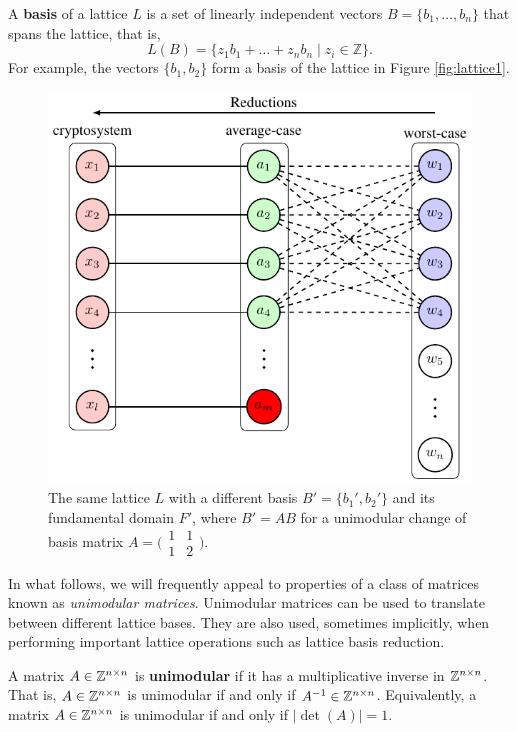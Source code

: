 \documentclass[../main.tex]{subfiles}
\begin{document}
A \textbf{basis} 
\reversemarginpar
{}
of a lattice $L$ is a set of linearly independent vectors $B = \{b_1, \dots, b_n\}$ that spans the lattice, that is,
\begin{equation*}
    L(B)= \{z_1 b_1 + \dots + z_n b_n \mid z_i \in \mathbb{Z}\}.
\end{equation*}
For example, the vectors $\{b_1,b_2\}$ form a basis of the lattice in Figure \ref{fig:lattice1}.
\begin{figure}[ht]
  \centering
  \includegraphics[page=3]{images/Lattice_crypto_tikz_folder.pdf}
  \caption{The same lattice $L$ with a different basis $B'=\{b_1', b_2'\}$ and its fundamental domain $F'$, where $B'=AB$ for a unimodular change of basis matrix $A=\big(\begin{smallmatrix}
  1 & 1\\
  1 & 2
\end{smallmatrix}\big)$.}
  \label{fig:lattice2}
\end{figure}

In what follows, we will frequently appeal to properties of a class of matrices known as \emph{unimodular matrices}. Unimodular matrices can be used to translate between different lattice bases. They are also used, sometimes implicitly, when performing important lattice operations such as lattice basis reduction.
\begin{definition}
\reversemarginpar
{}
A matrix $A \in \mathbb{Z}^{n\times n}$ is \textbf{unimodular} if it has a multiplicative inverse in $\mathbb{Z}^{n\times n}$. That is, $A \in \mathbb{Z}^{n\times n}$ is unimodular if and only if $A^{-1} \in \mathbb{Z}^{n\times n}$. Equivalently, a matrix $A \in \mathbb{Z}^{n\times n}$ is unimodular if and only if $|\det(A)| = 1$.
\end{definition}
\end{document}
